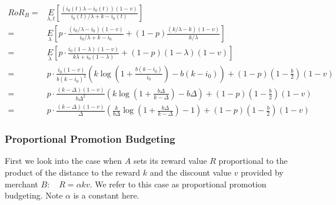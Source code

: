 \begin{align*}
RoR_B =& \underset{\lambda, t}E\left[\frac{(i_0(t)\lambda - i_0(t))(1-v)}{i_0(t)/\lambda + k - i_0(t)}\right]\\
                                     =& \underset{\lambda}E\left[p\cdot\frac{(i_0/\lambda - i_0)(1-v)}{i_0/\lambda + k - i_0} + (1-p)\frac{(k/\lambda - k)(1-v)}{k/\lambda}\right]\\
                                     =& \underset{\lambda}E\left[p\cdot\frac{i_0(1-\lambda)(1-v)}{k\lambda + i_0(1-\lambda)} + (1-p)(1-\lambda)(1-v)\right]\\
                                     =& p\cdot\frac{i_0(1-v)}{b(k-i_0)^2}\left(k\log\left(1+\frac{b(k-i_0)}{i_0}\right) - b(k-i_0)\right) + (1-p)(1-\frac{b}{2})(1-v)\\
                                     =& p\cdot\frac{(k-\Delta)(1-v)}{b\Delta^2}\left(k\log\left(1+\frac{b\Delta}{k-\Delta}\right) - b\Delta\right) + (1-p)(1-\frac{b}{2})(1-v)\\
                                     =& p\cdot\frac{(k-\Delta)(1-v)}{\Delta}\left(\frac{k}{b\Delta}\log\left(1+\frac{b\Delta}{k-\Delta}\right) - 1\right) + (1-p)(1-\frac{b}{2})(1-v)\label{eq:rorB_eval}
\end{align*}

\subsubsection{Proportional Promotion Budgeting}
First we look into the case when $A$ sets its reward value $R$ proportional to the product of the distance to the reward $k$ and the discount value $v$ provided by merchant $B$: \ie~ $R = \alpha k v$.
We refer to this case as proportional promotion budgeting.
Note $\alpha$ is a constant here.

